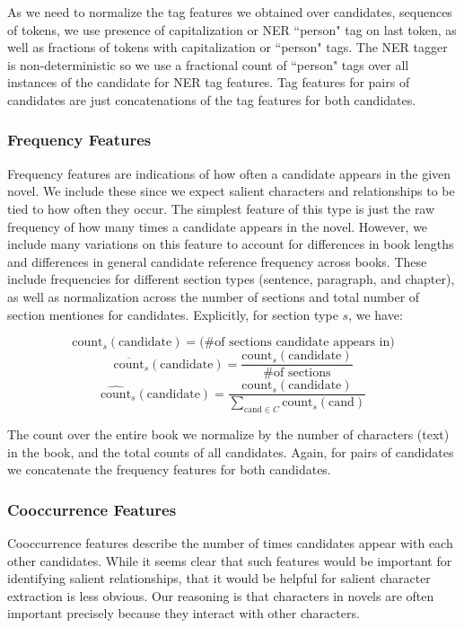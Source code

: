 \documentclass[12pt]{article}
\begin{document}
        As we need to normalize the tag features we obtained over candidates, sequences of tokens,
        we use presence of capitalization or NER ``person" tag on last token, as well as fractions
        of tokens with capitalization or ``person" tags. The NER tagger is non-deterministic so
        we use a fractional count of ``person" tags over all instances of the candidate for NER
        tag features. Tag features for pairs of candidates are just concatenations of the tag
        features for both candidates.

        \subsubsection{Frequency Features}

        Frequency features are indications of how often a candidate appears in the given novel. We include 
        these since we expect salient characters and relationships to be tied to how often they occur. 
        The simplest feature of this type is just the raw frequency of how many times a candidate
        appears in the novel. However, we include many variations on this feature to account for
        differences in book lengths and differences in general candidate reference frequency across books.
        These include frequencies for different section types (sentence, paragraph, and chapter), as well
        as normalization across the number of sections and total number of section mentiones for candidates.
        Explicitly, for section type $s$, we have:
        
        \[\mbox{count}_s(\mbox{candidate}) = \mbox{(\# of sections candidate appears in)}\]
        \[\overline{\mbox{count}}_s(\mbox{candidate}) = \frac{\mbox{count}_s(\mbox{candidate})}{\mbox{\# of sections}}\]
        \[\hat{\mbox{count}}_s(\mbox{candidate}) = \frac{\mbox{count}_s(\mbox{candidate})}{\sum_{\mbox{cand}\in{C}}\mbox{count}_s(\mbox{cand})}\]

        The count over the entire book we normalize by the number of characters (text) in the book, and the total
        counts of all candidates. Again, for pairs of candidates we concatenate the frequency features for both
        candidates.

        \subsubsection{Cooccurrence Features}

        Cooccurrence features describe the number of times candidates appear with each other candidates. 
        While it seems clear that such features would be important for identifying salient relationships,
        that it would be helpful for salient character extraction is less obvious. Our reasoning is that 
        characters in novels are often important precisely because they interact with other
        characters. \\
\end{document}
